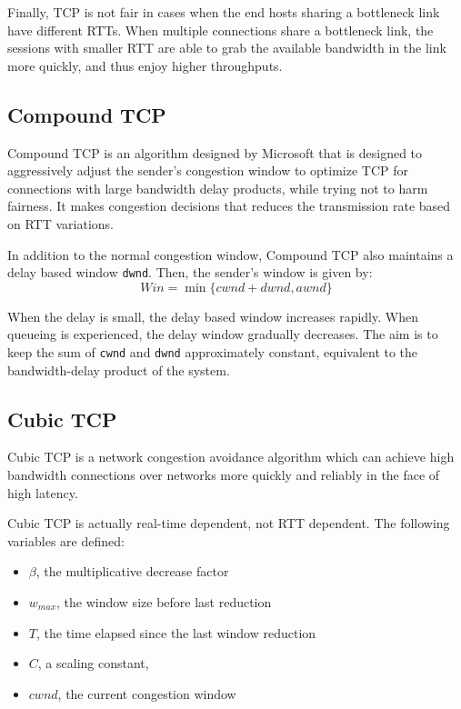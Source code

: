 \documentclass[12pt,letterpaper]{book}
\theoremstyle{definition}
\begin{document}
Finally, TCP is not fair in cases when the end hosts sharing a bottleneck link have different RTTs. When multiple connections share a bottleneck link, the sessions with smaller RTT are able to grab the available bandwidth in the link more quickly, and thus enjoy higher throughputs.

\subsection{Compound TCP}

Compound TCP is an algorithm designed by Microsoft that is designed to aggressively adjust the sender's congestion window to optimize TCP for connections with large bandwidth delay products, while trying not to harm fairness. It makes congestion decisions that reduces the transmission rate based on RTT variations.

In addition to the normal congestion window, Compound TCP also maintains a delay based window \texttt{dwnd}. Then, the sender's window is given by:
\[Win = \min\{cwnd+dwnd, awnd\}\]

When the delay is small, the delay based window increases rapidly. When queueing is experienced, the delay window gradually decreases. The aim is to keep the sum of \texttt{cwnd} and \texttt{dwnd} approximately constant, equivalent to the bandwidth-delay product of the system.

\subsection{Cubic TCP}

Cubic TCP is a network congestion avoidance algorithm which can achieve high bandwidth connections over networks more quickly and reliably in the face of high latency. 

Cubic TCP is actually real-time dependent, not RTT dependent. The following variables are defined:

\begin{itemize}
  \item $\beta$, the multiplicative decrease factor
  \item $w_{max}$, the window size before last reduction
  \item $T$, the time elapsed since the last window reduction
  \item $C$, a scaling constant,
  \item $cwnd$, the current congestion window
\end{itemize}
\end{document}
